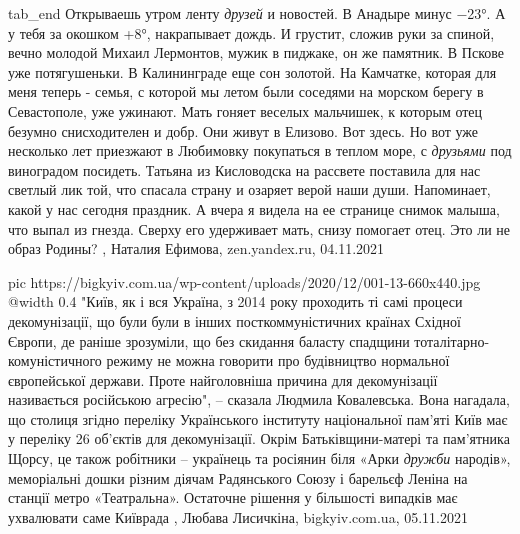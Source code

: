   tab_end
\fi
Открываешь утром ленту \emph{друзей} и новостей. В Анадыре минус −23°. А у тебя за
окошком +8°, накрапывает дождь. И грустит, сложив руки за спиной, вечно молодой
Михаил Лермонтов, мужик в пиджаке, он же памятник.  В Пскове уже потягушеньки.
В Калининграде еще сон золотой. На Камчатке, которая для меня теперь - семья, с
которой мы летом были соседями на морском берегу в Севастополе, уже ужинают.
Мать гоняет веселых мальчишек, к которым отец безумно снисходителен и добр.
Они живут в Елизово. Вот здесь.  Но вот уже несколько лет приезжают в Любимовку
покупаться в теплом море, с \emph{друзьями} под виноградом посидеть.  Татьяна
из Кисловодска на рассвете поставила для нас светлый лик той, что спасала
страну и озаряет верой наши души. Напоминает, какой у нас сегодня праздник.
А вчера я видела на ее странице снимок малыша, что выпал из гнезда.  Сверху его
удерживает мать, снизу помогает отец. Это ли не образ Родины?
, Наталия Ефимова, zen.yandex.ru, 04.11.2021

\ifcmt
  pic https://bigkyiv.com.ua/wp-content/uploads/2020/12/001-13-660x440.jpg
  @width 0.4
\fi
"Київ, як і вся Україна, з 2014 року проходить ті самі процеси декомунізації,
що були були в інших посткоммуністичних країнах Східної Європи, де раніше
зрозуміли, що без скидання баласту спадщини тоталітарно-комуністичного режиму
не можна говорити про будівництво нормальної європейської держави. Проте
найголовніша причина для декомунізації називається російською агресію", –
сказала Людмила Ковалевська.  Вона нагадала, що столиця згідно переліку
Українського інституту національної пам'яті Київ має у переліку 26 об'єктів для
декомунізації. Окрім Батьківщини-матері та пам'ятника Щорсу, це також робітники
– українець та росіянин біля «Арки \emph{дружби} народів», меморіальні дошки
різним діячам Радянського Союзу і барельєф Леніна на станції метро
«Театральна». Остаточне рішення у більшості випадків має ухвалювати саме
Київрада
, 
Любава Лисичкіна, bigkyiv.com.ua, 05.11.2021
